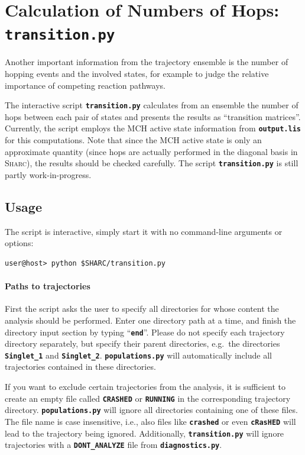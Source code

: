 \documentclass[a4paper,10pt,DIV=15,openany,twoside=false]{scrbook}
\newcommand{\ttt}[1]{\textbf{\texttt{#1}}}
\begin{document}

\section{Calculation of Numbers of Hops: \ttt{transition.py}}\label{sec:transition.py}

Another important information from the trajectory ensemble is the number of hopping events and the involved states, for example to judge the relative importance of competing reaction pathways.

The interactive script \ttt{transition.py} calculates from an ensemble the number of hops between each pair of states and presents the results as ``transition matrices''.
Currently, the script employs the MCH active state information from \ttt{output.lis} for this computations. 
Note that since the MCH active state is only an approximate quantity (since hops are actually performed in the diagonal basis in \textsc{Sharc}), the results should be checked carefully.
The script \ttt{transition.py} is still partly work-in-progress.

\subsection{Usage}

The script is interactive, simply start it with no command-line arguments or options:
\begin{verbatim}
user@host> python $SHARC/transition.py
\end{verbatim}

\paragraph{Paths to trajectories}

First the script asks the user to specify all directories for whose content the analysis should be performed. Enter one directory path at a time, and finish the directory input section by typing ``\ttt{end}''. Please do not specify each trajectory directory separately, but specify their parent directories, e.g.\ the directories \ttt{Singlet\_1} and \ttt{Singlet\_2}. \ttt{populations.py} will automatically include all trajectories contained in these directories.

If you want to exclude certain trajectories from the analysis, it is sufficient to create an empty file called \ttt{CRASHED} or \ttt{RUNNING} in the corresponding trajectory directory. \ttt{populations.py} will ignore all directories containing one of these files. The file name is case insensitive, i.e., also files like \ttt{crashed} or even \ttt{cRasHED} will lead to the trajectory being ignored.
Additionally, \ttt{transition.py} will ignore trajectories with a \ttt{DONT\_ANALYZE} file from \ttt{diagnostics.py}.
\end{document}
